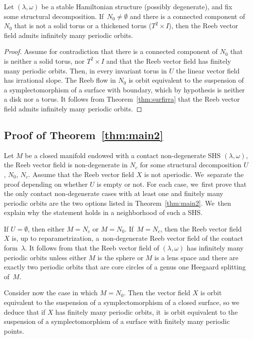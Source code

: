 \begin{Corollary}
Let $(\lambda, \omega)$ be a stable Hamiltonian structure ({possibly} degenerate), and fix some structural decomposition. If~$N_0\neq \emptyset$ and there is a connected component of $N_0$ that is not a solid torus or a thickened torus ($T^2\times I$), then the Reeb vector field admits infinitely many periodic orbits.
\end{Corollary}

\begin{proof}
Assume for contradiction that there is a connected component of $N_0$ that is neither a solid torus, nor $T^2\times I$ and that the Reeb vector field has finitely many periodic orbits. Then, in every invariant torus in $U$ the linear vector field has irrational slope. The Reeb flow in $N_0$ is orbit equivalent to the suspension of a symplectomorphism of a surface with boundary, which by hypothesis is neither a disk nor a torus. It follows from Theorem~\ref{thm:surfirra} that the Reeb vector field admits infinitely many periodic orbits.
\end{proof}

\subsection{Proof of Theorem~\ref{thm:main2}}

Let $M$ be a closed manifold endowed with a contact non-degenerate SHS $(\lambda,\omega)$, \ie the Reeb vector field is non-degenerate in $N_c$ for some structural decomposition $U$, $N_0$, $N_c$. Assume that the Reeb vector field $X$ is not aperiodic. We~separate the proof depending on whether $U$ is empty or not. For each case, we~first prove that the only contact non-degenerate cases with at least one and finitely many periodic orbits are the two options listed in Theorem~\ref{thm:main2}. We~then explain why
the statement holds in a neighborhood of such a SHS.

{If $U\!=\!\emptyset$, then either $M\!=\!N_c$ or $M\!=\!N_0$. If~$M\!=\!N_c$,} then the Reeb vector field~$X$ is, up to reparametrization, a~non-degenerate Reeb vector field of the contact form~$\lambda$.
It follows from \cite[Th.\,1.2]{CDR} that the Reeb vector field of $(\lambda, \omega)$ has infinitely many periodic orbits unless either $M$ is the sphere or $M$ is a lens space and there are exactly two periodic orbits that are core circles of a genus one Heegaard splitting of~$M$.

Consider now the case in which $M=N_0$. Then the vector field $X$ is orbit equivalent to the suspension of a symplectomorphism of a closed surface, so we deduce that if $X$ has finitely many periodic orbits, it~is orbit equivalent to the suspension of a symplectomorphism of a surface with finitely many periodic points.

